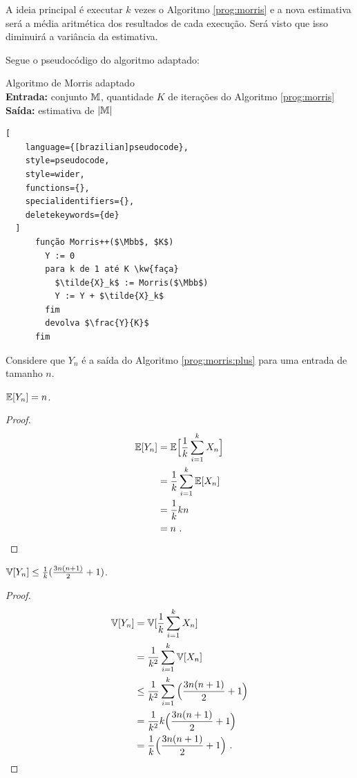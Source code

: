A ideia principal é executar $k$ vezes o Algoritmo \ref{prog:morris} e a nova estimativa será a média aritmética dos resultados
de cada execução. Será visto que isso diminuirá a variância da estimativa.

Segue o pseudocódigo do algoritmo adaptado:
\begin{programruledcaption}{
Algoritmo de Morris adaptado\label{prog:morris:plus}
\\ \textbf{Entrada:} conjunto $\mathbb{M}$, quantidade $K$ de iterações do Algoritmo \ref{prog:morris} 
\\ \textbf{Saída:} estimativa de $|\mathbb{M}|$
\label{prog:flajolet-martin}
}
  \begin{lstlisting}[
    language={[brazilian]pseudocode},
    style=pseudocode,
    style=wider,
    functions={},
    specialidentifiers={},
    deletekeywords={de}
  ]
      função Morris++($\Mbb$, $K$)
        Y := 0
        para k de 1 até K \kw{faça}
          $\tilde{X}_k$ := Morris($\Mbb$)
          Y := Y + $\tilde{X}_k$
        fim
        devolva $\frac{Y}{K}$
      fim
  \end{lstlisting}
\end{programruledcaption}

Considere que $Y_n$ é a saída do Algoritmo \ref{prog:morris:plus} para uma entrada de tamanho $n$.

\begin{lemma}\label{morris:plus:expected_value}
  $\mathbb{E}[Y_n] = n$.
\end{lemma}

\begin{proof}

\begin{align*}
  \mathbb{E}[Y_n] 
    &= \mathbb{E} \Big[ \frac{1}{k} \sum_{i=1}^{k} X_n \Big]  \\
    &= \frac{1}{k} \sum_{i=1}^{k} \mathbb{E}[X_n] \\
    &= \frac{1}{k} k n  \\
    &= n \ .
\end{align*}

\end{proof}

\begin{lemma}\label{morris:plus:variance}
  $\mathbb{V}[Y_n] \leq \frac{1}{k} ( \frac{3n(n+1)}{2} + 1 )$.
\end{lemma}

\begin{proof}
  
\begin{align*}
  \mathbb{V}[Y_n] 
    &= \mathbb{V}[\frac{1}{k} \sum_{i=1}^{k} X_n] \\
    &= \frac{1}{k^2} \sum_{i=1}^{k}\mathbb{V}[X_n]  \\
    &\leq \frac{1}{k^2} \sum_{i=1}^{k} \Big( \frac{3n(n+1)}{2} + 1 \Big)  \\
    &= \frac{1}{k^2} k \Big( \frac{3n(n+1)}{2} + 1 \Big)  \\
    &= \frac{1}{k} \Big( \frac{3n(n+1)}{2} + 1 \Big) \ .
\end{align*}

\end{proof}

